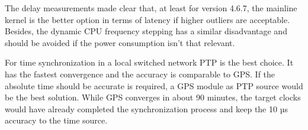 The delay measurements made clear that, at least for version 4.6.7, the mainline kernel is the better option in terms of latency if higher outliers are acceptable. Besides, the dynamic CPU frequency stepping has a similar disadvantage and should be avoided if the power consumption isn’t that relevant.

For time synchronization in a local switched network PTP is the best choice. It has the fastest convergence and the accuracy is comparable to GPS. If the absolute time should be accurate is required, a GPS module as PTP source would be the best solution. While GPS converges in about 90 minutes, the target clocks would have already completed the synchronization process and keep the 10 µs accuracy to the time source.

